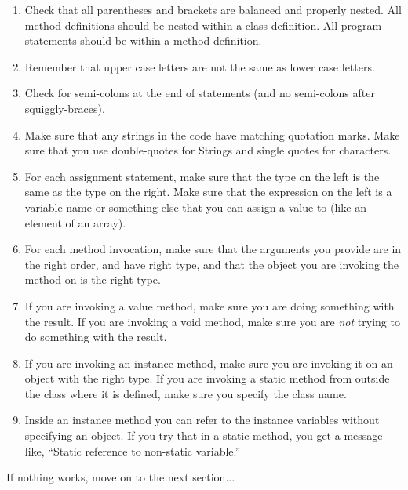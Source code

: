 \documentclass[12pt]{book}
\theoremstyle{exercise}
\begin{document}
\begin{enumerate}

\item Check that all parentheses and brackets are balanced and properly nested.
All method definitions should be nested within a class definition.
All program statements should be within a method definition.

\item Remember that upper case letters are not the same as lower case letters.

\item Check for semi-colons at the end of statements (and no semi-colons after squiggly-braces).

\item Make sure that any strings in the code have matching quotation marks.  Make sure that you use double-quotes for Strings and single quotes for characters.

\item For each assignment statement, make sure that the type on the left is the same as the type on the right.
Make sure that the expression on the left is a variable name or something else that you can assign a value to (like an element of an array).

\item For each method invocation, make sure that the arguments you provide are in the right order, and have right type, and that the object you are invoking the method on is the right type.

\item If you are invoking a value method, make sure you are doing something with the result.
If you are invoking a void method, make sure you are {\em not} trying to do something with the result.

\item If you are invoking an instance method, make sure you are invoking it on an object with the right type.
If you are invoking a static method from outside the class where it is defined, make sure you specify the class name.

\item Inside an instance method you can refer to the instance variables without specifying an object.
If you try that in a static method, you get a message like, ``Static reference to non-static variable.''

\end{enumerate}

If nothing works, move on to the next section...
\end{document}
